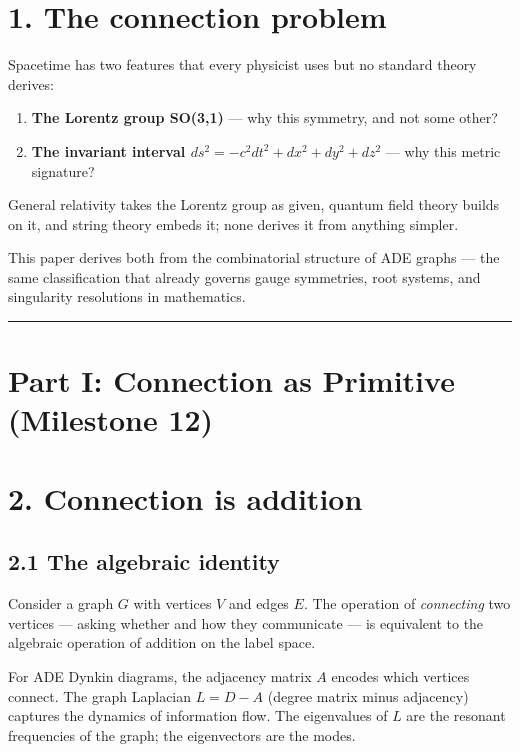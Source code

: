 \documentclass[11pt,a4paper]{article}
\providecommand{\tightlist}{\setlength{\itemsep}{0pt}\setlength{\parskip}{0pt}}
\begin{document}
\section*{1. The connection problem}

Spacetime has two features that every physicist uses but no standard theory derives:

\begin{enumerate}\tightlist
\item \textbf{The Lorentz group SO(3,1)} — why this symmetry, and not some other?
\item \textbf{The invariant interval $ds^2 = -c^2 dt^2 + dx^2 + dy^2 + dz^2$} — why this metric signature?
\end{enumerate}

General relativity takes the Lorentz group as given, quantum field theory builds on it, and string theory embeds it; none derives it from anything simpler.

This paper derives both from the combinatorial structure of ADE graphs — the same classification that already governs gauge symmetries, root systems, and singularity resolutions in mathematics.

\begin{center}\rule{0.5\linewidth}{0.4pt}\end{center}

\section*{Part I: Connection as Primitive (Milestone 12)}

\section*{2. Connection is addition}

\subsection*{2.1 The algebraic identity}

Consider a graph $G$ with vertices $V$ and edges $E$. The operation of \emph{connecting} two vertices — asking whether and how they communicate — is equivalent to the algebraic operation of addition on the label space.

For ADE Dynkin diagrams, the adjacency matrix $A$ encodes which vertices connect. The graph Laplacian $L = D - A$ (degree matrix minus adjacency) captures the dynamics of information flow. The eigenvalues of $L$ are the resonant frequencies of the graph; the eigenvectors are the modes.
\end{document}
